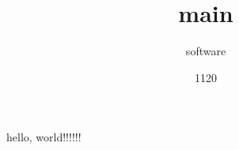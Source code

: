 \documentclass[twocolumn]{jsarticle}
\begin{document}
\title{main}
\author{software}
\date{1120}
\maketitle

hello, world!!!!!!
\end{document}
